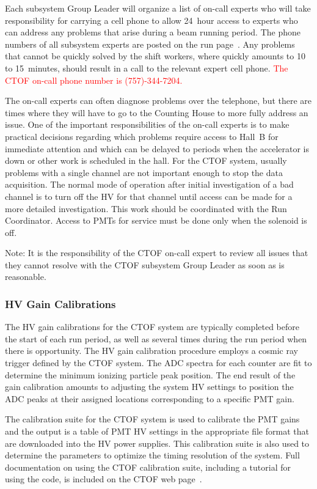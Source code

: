 \documentclass[12pt]{article}
\begin{document}
Each subsystem Group Leader will organize a list of on-call experts who will 
take responsibility for carrying a cell phone to allow 24~hour access to experts 
who can address any problems that arise during a beam running period. The 
phone numbers of all subsystem experts are posted on the run page~\cite{run-page}. 
Any problems that cannot be quickly solved by the shift workers, where quickly 
amounts to 10 to 15~minutes, should result in a call to the relevant expert cell 
phone. \textcolor{red}{The CTOF on-call phone number is (757)-344-7204.} 

The on-call experts can often diagnose problems over the telephone, but there are 
times where they will have to go to the Counting House to more fully address an 
issue. One of the important responsibilities of the on-call experts is to make 
practical decisions regarding which problems require access to Hall~B for immediate 
attention and which can be delayed to periods when the accelerator is down or other 
work is scheduled in the hall. For the CTOF system, usually problems with a single 
channel are not important enough to stop the data acquisition. The normal mode of 
operation after initial investigation of a bad channel is to turn off the HV for 
that channel until access can be made for a more detailed investigation. This work 
should be coordinated with the Run Coordinator. Access to PMTs for service must be 
done only when the solenoid is off.

Note: It is the responsibility of the CTOF on-call expert to review all issues that 
they cannot resolve with the CTOF subsystem Group Leader as soon as is reasonable.

\subsubsection{HV Gain Calibrations}
\label{gain-calib}

The HV gain calibrations for the CTOF system are typically completed before the 
start of each run period, as well as several times during the run period when there 
is opportunity. The HV gain calibration procedure employs a cosmic ray trigger 
defined by the CTOF system. The ADC spectra for each counter are fit to determine
the minimum ionizing particle peak position. The end result of the gain calibration 
amounts to adjusting the system HV settings to position the ADC peaks at their 
assigned locations corresponding to a specific PMT gain.

The calibration suite for the CTOF system is used to calibrate the PMT gains and 
the output is a table of PMT HV settings in the appropriate file format that are 
downloaded into the HV power supplies. This calibration suite is also used to 
determine the parameters to optimize the timing resolution of the system. Full 
documentation on using the CTOF calibration suite, including a tutorial for using 
the code, is included on the CTOF web page~\cite{ctof-web}.
\end{document}
